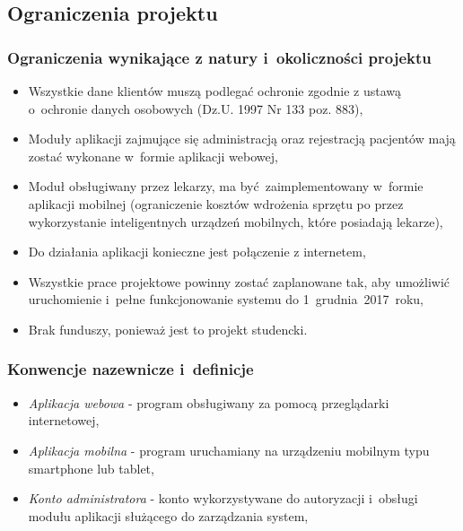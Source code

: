 \subsection{Ograniczenia projektu}

\subsubsection{Ograniczenia wynikające z natury i~okoliczności projektu}

\begin{itemize}
	\item Wszystkie dane klientów muszą podlegać ochronie zgodnie z ustawą o~ochronie danych osobowych (Dz.U. 1997 Nr 133 poz. 883),
	\item Moduły aplikacji zajmujące się administracją oraz rejestracją pacjentów mają zostać wykonane w~formie aplikacji webowej,
	\item Moduł obsługiwany przez lekarzy, ma być zaimplementowany w~formie aplikacji mobilnej (ograniczenie kosztów wdrożenia sprzętu po przez wykorzystanie inteligentnych urządzeń mobilnych, które posiadają lekarze),
	\item Do działania aplikacji konieczne jest połączenie z internetem,
	\item Wszystkie prace projektowe powinny zostać zaplanowane tak, aby umożliwić uruchomienie i~pełne funkcjonowanie systemu do 1~grudnia~2017~roku,
	\item Brak funduszy, ponieważ jest to projekt studencki.
\end{itemize}

\subsubsection{Konwencje nazewnicze i~definicje}
\begin{itemize}
	\item \textit{Aplikacja webowa} - program obsługiwany za pomocą przeglądarki internetowej,
	\item \textit{Aplikacja mobilna} - program uruchamiany na urządzeniu mobilnym typu smartphone lub tablet,
	\item \textit{Konto administratora} - konto wykorzystywane do autoryzacji i~obsługi modułu aplikacji służącego do zarządzania system,
\end{itemize}

